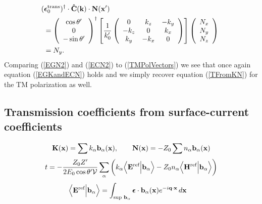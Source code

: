 \documentclass[letterpaper]{article}
\newcommand{\vbEps}{\boldsymbol{\epsilon}}
\begin{document}
\begin{align}
&\hspace{-0.05in}
 (\vbEps_0\sups{trans})^\dagger \cdot
 \vbhat{C}(\vb k) \cdot \vb N(\vb x^\prime)
\nn
&=
 \left(\begin{array}{c}\cos\theta^\prime \\ 0 \\-\sin\theta^\prime \end{array}\right)^\dagger
 \left[ \frac{1}{k_0^{\prime}}
        \left(\begin{array}{ccc}
               0       & k_z     & -k_y    \\
               -k_z    & 0       & k_x     \\
               k_y     & -k_x    & 0
              \end{array}
        \right)
 \right]
 \left(\begin{array}{c}N_x \\ N_y \\ N_z\end{array}\right)
\nn
&=
 N_y.
\label{ECN2}
\end{align}
Comparing (\ref{EGN2}) and (\ref{ECN2}) to (\ref{TMPolVectors})
we see that once again equation (\ref{EGKandECN}) holds
and we simply recover equation (\ref{TFromKN}) for the 
TM polarization as well.

\newpage
\subsection*{Transmission coefficients from surface-current coefficients} 
$$ \mathbf{K}(\mathbf{x})=\sum k_\alpha \mathbf{b}_\alpha(\mathbf{x}), \qquad 
   \mathbf{N}(\mathbf{x})=-Z_0 \sum n_\alpha \mathbf{b}_\alpha(\mathbf{x})
$$
$$ t=-\frac{Z_0 Z^\prime}{2E_0 \cos \theta^\prime \mathcal{V}}
      \sum_\alpha 
        \bigg( k_\alpha \Big\langle \mathbf{E}^{\hbox{\scriptsize{ref}}} \Big| \mathbf{b}_\alpha \Big\rangle
             -Z_0 n_\alpha \Big\langle \mathbf{H}^{\hbox{\scriptsize{ref}}} \Big| \mathbf{b}_\alpha \Big\rangle
        \bigg)
$$
\begin{align*}
 \INP{\vb E\sups{ref}}{\vb b_\alpha}
&=\int_{\text{sup } \vb b_\alpha}
  \vbEps \cdot \vb b_\alpha(\vb x)e^{-i\vb q \cdot \vb x}
  \, d\vb x
\end{align*}
\end{document}
